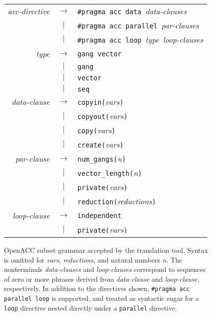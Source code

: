 \documentclass{sig-alternate-05-2015}
\begin{document}
\begin{figure}
\begin{tabular}{rcl}
\textit{acc-directive} &$\rightarrow$& \texttt{\#pragma acc data\ }\textit{data-clauses} \\
                       &     $|$     & \texttt{\#pragma acc parallel}\texttt{\ }\textit{par-clauses} \\
                       &     $|$     & \texttt{\#pragma acc loop\ }\textit{type}\texttt{\ }\textit{loop-clauses} \\
\textit{type}          &$\rightarrow$& \texttt{gang vector} \\
                       &     $|$     & \texttt{gang} \\
                       &     $|$     & \texttt{vector} \\
                       &     $|$     & \texttt{seq} \\
\textit{data-clause}   &$\rightarrow$& \texttt{copyin(}\textit{vars}\texttt{)} \\
                       &     $|$     & \texttt{copyout(}\textit{vars}\texttt{)} \\
                       &     $|$     & \texttt{copy(}\textit{vars}\texttt{)} \\
                       &     $|$     & \texttt{create(}\textit{vars}\texttt{)} \\
\textit{par-clause}&$\rightarrow$&\texttt{num\_gangs(}\textit{n}\texttt{)} \\
                       &     $|$     & \texttt{vector\_length(}\textit{n}\texttt{)} \\
                       &     $|$     & \texttt{private(}\textit{vars}\texttt{)} \\
                       &     $|$     & \texttt{reduction(}\textit{reductions}\texttt{)} \\
\textit{loop-clause}   &$\rightarrow$& \texttt{independent} \\
                       &     $|$     & \texttt{private(}\textit{vars}\texttt{)} \\
\end{tabular}
\caption{OpenACC subset grammar accepted by the translation tool.  Syntax is
omitted for \textit{vars}, \textit{reductions}, and natural numbers \textit{n}.
The nonterminals \textit{data-clauses} and \textit{loop-clauses} correspond to
sequences of zero or more phrases derived from \textit{data-clause} and
\textit{loop-clause}, respectively.  In addition to the directives shown,
\texttt{\#pragma acc parallel loop} is supported, and treated as syntactic
sugar for a \texttt{loop} directive nested directly under a \texttt{parallel}
directive.}
\label{fig:grammar}
\end{figure}
\end{document}
